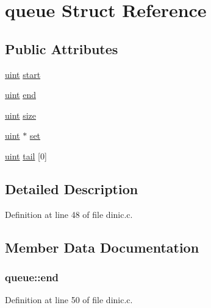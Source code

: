 \hypertarget{structqueue}{
\section{queue Struct Reference}
\label{structqueue}
}
\subsection*{Public Attributes}
\begin{DoxyCompactItemize}
\item 
\hyperlink{dinic_8c_a91ad9478d81a7aaf2593e8d9c3d06a14}{uint} \hyperlink{structqueue_a0f850ad75a962c21fea47ea4668d22d3}{start}
\item 
\hyperlink{dinic_8c_a91ad9478d81a7aaf2593e8d9c3d06a14}{uint} \hyperlink{structqueue_a54ffb2708443beb9a62458e4857ff1c4}{end}
\item 
\hyperlink{dinic_8c_a91ad9478d81a7aaf2593e8d9c3d06a14}{uint} \hyperlink{structqueue_a3da3651335989ee987013cf401fe95f7}{size}
\item 
\hyperlink{dinic_8c_a91ad9478d81a7aaf2593e8d9c3d06a14}{uint} $\ast$ \hyperlink{structqueue_a7dfaf91cd2f512796f794c42eb9a8005}{set}
\item 
\hyperlink{dinic_8c_a91ad9478d81a7aaf2593e8d9c3d06a14}{uint} \hyperlink{structqueue_a2d8e2d86310561ed10242d25c8d91213}{tail} \mbox{[}0\mbox{]}
\end{DoxyCompactItemize}


\subsection{Detailed Description}


Definition at line 48 of file dinic.c.



\subsection{Member Data Documentation}
\hypertarget{structqueue_a54ffb2708443beb9a62458e4857ff1c4}{
\subsubsection[{end}]{ {\bf queue::end}}}
\label{structqueue_a54ffb2708443beb9a62458e4857ff1c4}


Definition at line 50 of file dinic.c.

